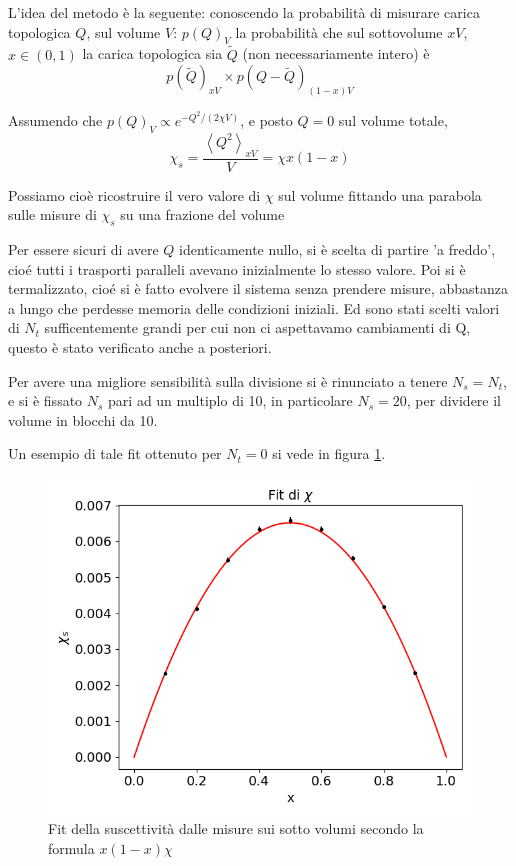 \documentclass[a4paper, 12pt]{article}
\begin{document}
L'idea del metodo è la seguente:
conoscendo la probabilità di misurare carica topologica $Q$, sul volume $V$: $p(Q)_V$
la probabilità che sul sottovolume $xV$, $x \in (0,1)$ la carica topologica sia
$\tilde{Q}$ (non necessariamente intero) è
\begin{equation}
p(\tilde{Q})_{xV} \times p(Q - \tilde{Q})_{(1-x)V}
\end{equation}

Assumendo che $p(Q)_V \propto e^{-Q^2 / (2 \chi V)}$, e posto $Q=0$ sul volume totale,
\begin{equation}
\chi_s = \frac{\left< Q^2 \right>_{xV}}{V} = \chi x (1-x)
\end{equation}

Possiamo cioè ricostruire il vero valore di $\chi$ sul volume
fittando una parabola sulle misure di $\chi_s$ su una frazione del volume

Per essere sicuri di avere $Q$ identicamente nullo, si è scelta di partire 'a freddo',
cioé tutti i trasporti paralleli avevano inizialmente lo stesso valore.
Poi si è termalizzato, cioé si è fatto evolvere il sistema senza prendere misure,
abbastanza a lungo che perdesse memoria delle condizioni iniziali.
Ed sono stati scelti valori di $N_t$ sufficentemente grandi per cui non ci
aspettavamo cambiamenti di Q, questo è stato verificato anche a posteriori.

Per avere una migliore sensibilità sulla divisione si è rinunciato a tenere
$N_s = N_t$, e si è fissato $N_s$ pari ad un multiplo di 10,
in particolare $N_s = 20$, per dividere il volume in blocchi da 10.

Un esempio di tale fit ottenuto per $N_t = 0$ si vede in figura
\ref{suscettivity_fit}.

\begin{figure}
\includegraphics[width=\linewidth]{../figure/suscettivity_fit17.png}
\caption{Fit della suscettività dalle misure sui sotto volumi
secondo la formula $x(1-x) \chi$}
\label{suscettivity_fit}
\end{figure}
\end{document}
